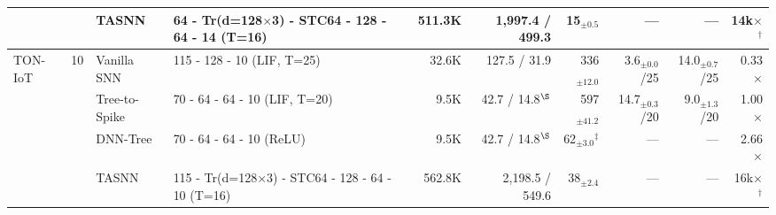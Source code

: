 \begin{table}[!ht]
{\begin{tabular}{l c l l r r r r r r}
& & TASNN         & 64 - Tr(d=128$\times$3) - STC64 - 128 - 64 - 14 (T=16) & 511.3K & 1,997.4 / 499.3 & 15$_{\pm0.5}$ & --- & --- & 14k$\times$$^\dagger$ \\
\midrule
\multirow{4}{*}{TON-IoT} & \multirow{4}{*}{10}
  & Vanilla SNN   & 115 - 128 - 10 (LIF, T=25) & 32.6K & 127.5 / 31.9 & 336$_{\pm12.0}$ & 3.6$_{\pm0.0}$/25 & 14.0$_{\pm0.7}$/25 & 0.33$\times$ \\
& & Tree-to-Spike & 70 - 64 - 64 - 10 (LIF, T=20) & 9.5K & 42.7 / 14.8$^{\S}$ & 597$_{\pm41.2}$ & 14.7$_{\pm0.3}$/20 & 9.0$_{\pm1.3}$/20 & 1.00$\times$ \\
& & DNN-Tree      & 70 - 64 - 64 - 10 (ReLU) & 9.5K & 42.7 / 14.8$^{\S}$ & 62$_{\pm3.0}$$^\ddagger$ & --- & --- & 2.66$\times$ \\
& & TASNN         & 115 - Tr(d=128$\times$3) - STC64 - 128 - 64 - 10 (T=16) & 562.8K & 2,198.5 / 549.6 & 38$_{\pm2.4}$ & --- & --- & 16k$\times$$^\dagger$ \\
\bottomrule
\end{tabular}}
\end{table}

